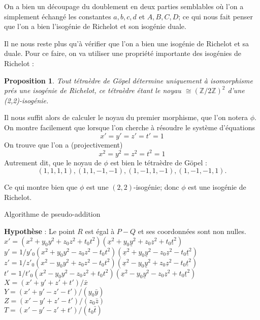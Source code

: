 \documentclass[a4paper,12pt]{article}
\newtheorem{proposition}[theoreme]{Proposition}
\theoremstyle{definition}
\theoremstyle{remark}
\numberwithin{equation}{section}
\begin{document}
On a bien un découpage du doublement en deux parties semblables où l'on a simplement échangé les constantes $a,b,c,d$ et $A,B,C,D$; ce qui nous fait penser que l'on a bien l'isogénie de Richelot et son isogénie duale. 

Il ne nous reste plus qu'à vérifier que l'on a bien une isogénie de Richelot et sa duale. Pour ce faire, on va utiliser une propriété importante des isogénies de Richelot :
\begin{proposition}
Tout tétraèdre de G\"opel détermine uniquement à isomorphisme prés une isogénie de Richelot, ce tétraèdre étant le noyau $\cong (\mathbb{Z}/2\mathbb{Z})^2$ d'une (2,2)-isogénie.
\end{proposition}

Il nous suffit alors de calculer le noyau du premier morphisme, que l'on notera $\phi$. On montre facilement que lorsque l'on cherche à résoudre le système d'équations
$$x' = y' = z' = t' = 1$$
On trouve que l'on a (projectivement)
$$x^2 = y^2 = z^2 = t^2 = 1$$
Autrement dit, que le noyau de $\phi$ est bien le tétraèdre de G\"opel :
$$(1,1,1,1),(1,1,-1,-1),(1,-1,1,-1),(1,-1,-1,1).$$

Ce qui montre bien que $\phi$ est une $(2,2)$-isogénie; donc $\phi$ est une isogénie de Richelot.

\begin{algorithm}
\label{ADD2}
\caption{Algorithme de pseudo-addition}
\textbf{Hypothèse} : Le point $R$ est égal à $P-Q$ et ses coordonnées sont non nulles. \\
$x' = (x^2 + y_0y^2 + z_0z^2 + t_0t^2)(\underline{x}^2 + y_0\underline{y}^2 + z_0\underline{z}^2 + t_0\underline{t}^2)$ \\
$y' = 1/y'_0(x^2 + y_0y^2 - z_0z^2 - t_0t^2)(\underline{x}^2 + y_0\underline{y}^2 - z_0\underline{z}^2 - t_0\underline{t}^2)$ \\
$z' = 1/z'_0(x^2 - y_0y^2 + z_0z^2 - t_0t^2)(\underline{x}^2 - y_0\underline{y}^2 + z_0\underline{z}^2 - t_0\underline{t}^2)$ \\
$t' = 1/t'_0(x^2 - y_0y^2 - z_0z^2 + t_0t^2)(\underline{x}^2 - y_0\underline{y}^2 - z_0\underline{z}^2 + t_0\underline{t}^2)$ \\
$X = (x' + y' + z' + t')/\bar{x}$ \\
$Y = (x' + y' - z' - t')/(y_0\bar{y})$ \\
$Z = (x' - y' + z' - t')/(z_0\bar{z})$ \\
$T = (x' - y' - z' + t')/(t_0\bar{t})$ \\
\end{algorithm}
\end{document}
